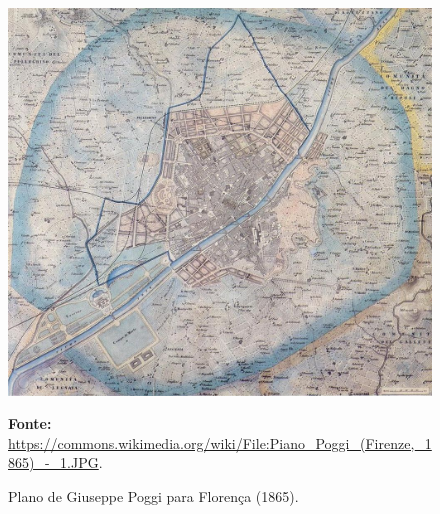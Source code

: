 \begin{a3paisagem}
\begin{figure}[!htp]
\caption{Plano de Giuseppe Poggi para Florença (1865).}
\centering
\includegraphics[height=0.9\textheight]{2-cap1/complementos/mapas/1865-planopoggi-florenca.jpg}{\par \footnotesize \textbf{Fonte:} \url{https://commons.wikimedia.org/wiki/File:Piano_Poggi_(Firenze,_1865)_-_1.JPG}.}
\label{fig:florenca1865} 
\end{figure}
\end{a3paisagem}


